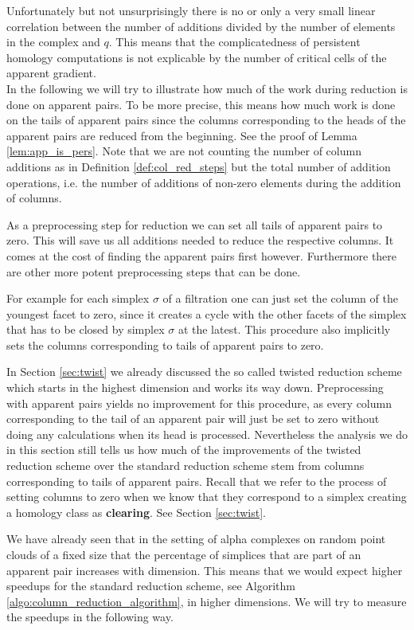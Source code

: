 Unfortunately but not unsurprisingly there is no or only a very small linear correlation between the number of additions divided by the number of elements in the complex and $q$. This means that the complicatedness of persistent homology computations is not explicable by the number of critical cells of the apparent gradient. \\ 

In the following we will try to illustrate how much of the work during reduction is done on apparent pairs. To be more precise, this means how much work is done on the tails of apparent pairs since the columns corresponding to the heads of the apparent pairs are reduced from the beginning. See the proof of Lemma \ref{lem:app_is_pers}. Note that we are not counting the number of column additions as in Definition \ref{def:col_red_steps} but the total number of addition operations, i.e. the number of additions of non-zero elements during the addition of columns.

As a preprocessing step for reduction we can set all tails of apparent pairs to zero. This will save us all additions needed to reduce the respective columns. It comes at the cost of finding the apparent pairs first however. Furthermore there are other more potent preprocessing steps that can be done. 

For example for each simplex $\sigma$ of a filtration one can just set the column of the youngest facet to zero, since it creates a cycle with the other facets of the simplex that has to be closed by simplex $\sigma$ at the latest. This procedure also implicitly sets the columns corresponding to tails of apparent pairs to zero.

In Section \ref{sec:twist} we already discussed the so called twisted reduction scheme which starts in the highest dimension and works its way down. Preprocessing with apparent pairs yields no improvement for this procedure, as every column corresponding to the tail of an apparent pair will just be set to zero without doing any calculations when its head is processed. Nevertheless the analysis we do in this section still tells us how much of the improvements of the twisted reduction scheme over the standard reduction scheme stem from columns corresponding to tails of apparent pairs. Recall that we refer to the process of setting columns to zero when we know that they correspond to a simplex creating a homology class as \textbf{clearing}. See Section \ref{sec:twist}.

We have already seen that in the setting of alpha complexes on random point clouds of a fixed size that the percentage of simplices that are part of an apparent pair increases with dimension. This means that we would expect higher speedups for the standard reduction scheme, see Algorithm \ref{algo:column_reduction_algorithm}, in higher dimensions. We will try to measure the speedups in the following way. 

